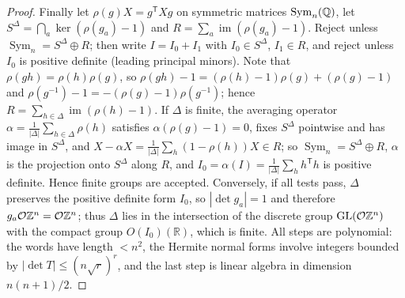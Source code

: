 \begin{proof}
Finally let $\rho(g)X=g^{\mathsf T}Xg$ on symmetric matrices $\operatorname{Sym}_n(\mathbb{Q})$, let
$S^\Delta=\bigcap_a\ker(\rho(g_a)-1)$ and $R=\sum_a\operatorname{im}(\rho(g_a)-1)$. Reject unless
$\operatorname{Sym}_n=S^\Delta\oplus R$; then write $I=I_0+I_1$ with $I_0\in S^\Delta$, $I_1\in R$, and
reject unless $I_0$ is positive definite (leading principal minors). Note that
$\rho(gh)=\rho(h)\rho(g)$, so $\rho(gh)-1=(\rho(h)-1)\rho(g)+(\rho(g)-1)$ and
$\rho(g^{-1})-1=-(\rho(g)-1)\rho(g^{-1})$; hence $R=\sum_{h\in\Delta}\operatorname{im}(\rho(h)-1)$.
If $\Delta$ is finite, the averaging operator $\alpha=\frac1{|\Delta|}\sum_{h\in\Delta}\rho(h)$
satisfies $\alpha(\rho(g)-1)=0$, fixes $S^\Delta$ pointwise and has image in $S^\Delta$, and
$X-\alpha X=\frac1{|\Delta|}\sum_h(1-\rho(h))X\in R$; so $\operatorname{Sym}_n=S^\Delta\oplus R$,
$\alpha$ is the projection onto $S^\Delta$ along $R$, and $I_0=\alpha(I)=\frac1{|\Delta|}\sum_hh^{\mathsf T}h$
is positive definite. Hence finite groups are accepted.
Conversely, if all tests pass, $\Delta$ preserves the positive definite form $I_0$, so
$|\det g_a|=1$ and therefore $g_a\mathcal O\mathbb{Z}^n=\mathcal O\mathbb{Z}^n$; thus $\Delta$ lies in the
intersection of the discrete group $\mathrm{GL}(\mathcal O\mathbb{Z}^n)$ with the compact group $O(I_0)(\mathbb R)$,
which is finite. All steps are polynomial: the words have length $<n^2$, the Hermite normal forms
involve integers bounded by $|\det T|\le(n\sqrt r)^r$, and the last step is linear algebra in
dimension $n(n+1)/2$.
\end{proof}


